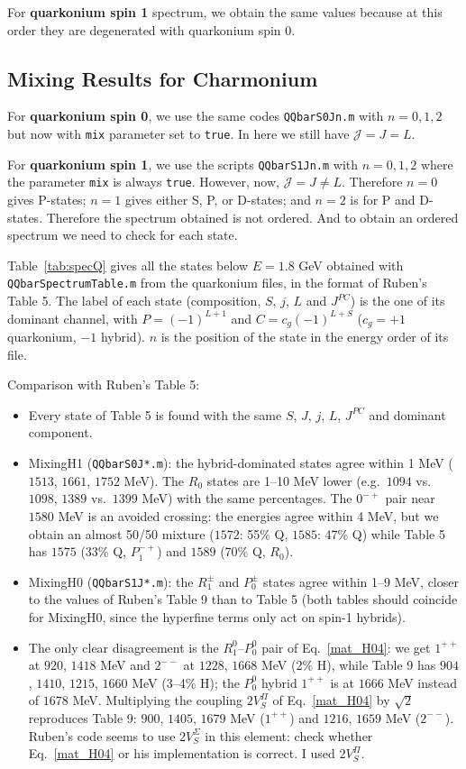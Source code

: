\documentclass[11pt, a4paper]{article}
\begin{document}
For \textbf{quarkonium spin 1} spectrum, we obtain the same values because at this order they are degenerated with quarkonium spin 0.

\subsection{Mixing Results for Charmonium}
For \textbf{quarkonium spin 0}, we use the same codes \texttt{QQbarS0Jn.m} with $n=0,1,2$ but now with \texttt{mix} parameter set to \texttt{true}. In here we still have $\mathcal{J}=J=L$.

For \textbf{quarkonium spin 1}, we use the scripts \texttt{QQbarS1Jn.m} with $n=0,1,2$ where the parameter \texttt{mix} is always \texttt{true}. However, now, $\mathcal{J}=J \neq L$. Therefore $n=0$ gives P-states; $n=1$ gives either S, P, or D-states; and $n=2$ is for P and D-states. Therefore the spectrum obtained is not ordered. And to obtain an ordered spectrum we need to check for each state.

Table~\ref{tab:specQ} gives all the states below $E=1.8$ GeV obtained with \texttt{QQbarSpectrumTable.m} from the quarkonium files, in the format of Ruben's Table 5. The label of each state (composition, $S$, $j$, $L$ and $J^{PC}$) is the one of its dominant channel, with $P=(-1)^{L+1}$ and $C=c_g(-1)^{L+S}$ ($c_g=+1$ quarkonium, $-1$ hybrid). $n$ is the position of the state in the energy order of its file.

Comparison with Ruben's Table 5:
\begin{itemize}
    \item Every state of Table 5 is found with the same $S$, $J$, $j$, $L$, $J^{PC}$ and dominant component.
    \item MixingH1 (\texttt{QQbarS0J*.m}): the hybrid-dominated states agree within 1 MeV ($1513$, $1661$, $1752$ MeV). The $R_0$ states are 1--10 MeV lower (e.g.\ $1094$ vs.\ $1098$, $1389$ vs.\ $1399$ MeV) with the same percentages. The $0^{-+}$ pair near $1580$ MeV is an avoided crossing: the energies agree within 4 MeV, but we obtain an almost 50/50 mixture ($1572$: 55\% Q, $1585$: 47\% Q) while Table 5 has $1575$ (33\% Q, $P_1^{-+}$) and $1589$ (70\% Q, $R_0$).
    \item MixingH0 (\texttt{QQbarS1J*.m}): the $R_1^\pm$ and $P_0^\pm$ states agree within 1--9 MeV, closer to the values of Ruben's Table 9 than to Table 5 (both tables should coincide for MixingH0, since the hyperfine terms only act on spin-1 hybrids).
    \item The only clear disagreement is the $R_1^0$--$P_0^0$ pair of Eq.~\eqref{mat_H04}: we get $1^{++}$ at $920$, $1418$ MeV and $2^{--}$ at $1228$, $1668$ MeV (2\% H), while Table 9 has $904$, $1410$, $1215$, $1660$ MeV (3--4\% H); the $P_0^0$ hybrid $1^{++}$ is at $1666$ MeV instead of $1678$ MeV. Multiplying the coupling $2V_S^\Pi$ of Eq.~\eqref{mat_H04} by $\sqrt{2}$ reproduces Table 9: $900$, $1405$, $1679$ MeV ($1^{++}$) and $1216$, $1659$ MeV ($2^{--}$). {\color{red} Ruben's code seems to use $2V_S^\Sigma$ in this element: check whether Eq.~\eqref{mat_H04} or his implementation is correct. I used $2V_S^\Pi$.}
\end{itemize}
\end{document}
